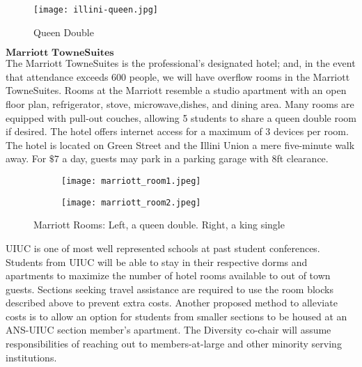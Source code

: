 \begin{figure}[H]
	\centering
	\texttt{[image: illini-queen.jpg]}
	\caption{Queen Double}		
\end{figure} 

$\textbf{Marriott TowneSuites}$\\
The Marriott TowneSuites is the professional's designated hotel; and, in the event that attendance exceeds 600 people, we will have overflow rooms in the Marriott TowneSuites. Rooms at the Marriott resemble a studio apartment with an open floor plan, refrigerator, stove, microwave,dishes, and dining area. Many rooms are equipped with pull-out couches, allowing 5 students to share a queen double room if desired. The hotel offers internet access for a maximum of 3 devices per room. The hotel is located on Green Street and the Illini Union a mere five-minute walk away. For $\$7$ a day, guests may park in a parking garage with 8ft clearance.\\

\begin{figure}[H]
	\centering
	\begin{subfigure}{0.5\textwidth}
		\centering
		\texttt{[image: marriott\_room1.jpeg]}
	\end{subfigure}%
	\begin{subfigure}{0.5\textwidth}
		\centering
		\texttt{[image: marriott\_room2.jpeg]}
	\end{subfigure}
	\caption{Marriott Rooms: Left, a queen double. Right, a king single}		
\end{figure} 

UIUC is one of most well represented schools at past student conferences. Students from UIUC will be able to stay in their respective dorms and apartments to maximize the number of hotel rooms available to out of town guests. Sections seeking travel assistance are required to use the room blocks described above to prevent extra costs. Another proposed method to alleviate costs is to allow an option for students from smaller sections to be housed at an ANS-UIUC section member's apartment. The Diversity co-chair will assume responsibilities of reaching out to members-at-large and other minority serving institutions. 


